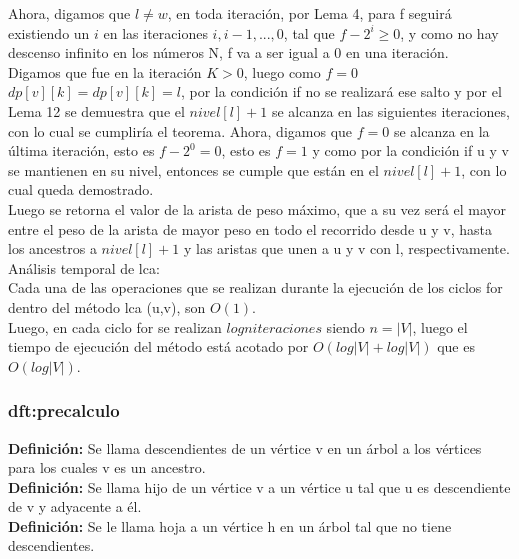 \documentclass[12pt]{article}
\begin{document}
Ahora, digamos que  $l \neq w$, en toda iteraci\'on,  por Lema 4,  para f seguir\'a existiendo un $i$ en las iteraciones 
$i,i-1,..., 0$, tal que $f - 2^i \geq 0$, y 
como no hay descenso infinito en los n\'umeros N, f va a ser igual a 0 en una iteraci\'on.\\
 Digamos que fue en la iteraci\'on $K > 0$, luego como $f = 0$
$dp[v] [k] = dp[v] [k] = l$, por la condici\'on if no se realizar\'a ese salto y por el Lema 12 se demuestra que el $nivel[l] + 1$ se alcanza en
las siguientes iteraciones, con lo cual se cumplir\'ia el teorema.  Ahora, digamos que $f = 0$ se alcanza en la \'ultima iteraci\'on, esto es $f - 2^0 = 0$,
esto es $f = 1$ y como por la condici\'on  if u y v se mantienen en su nivel, entonces se cumple que est\'an en el $nivel [l] + 1$, con lo cual
queda demostrado.\\


Luego se retorna el valor de la arista de peso m\'aximo, que a su vez ser\'a el mayor entre el peso de la arista de mayor peso en todo el recorrido desde u y v, hasta los
ancestros a $nivel [l] + 1$ y las aristas que unen a u y v con l, respectivamente.\\




An\'alisis temporal de lca:\\

Cada una de las operaciones que se realizan durante la ejecuci\'on de los ciclos for dentro del m\'etodo lca (u,v), son $O(1)$.\\

Luego, en cada ciclo for se realizan  $log n iteraciones$ siendo $n = |V|$, luego el tiempo de ejecuci\'on del m\'etodo est\'a acotado
 por $O(log |V| + log |V|)$ que es $O(log|V|)$.
\\



\subsubsection{\textbf{dft:precalculo}}

\textbf{Definición:} Se llama descendientes de un v\'ertice v en un \'arbol a los v\'ertices para los cuales v es un ancestro.\\

\textbf{Definición:} Se llama hijo de un v\'ertice v a un v\'ertice u tal que u es descendiente de v y adyacente a \'el.\\

\textbf{Definición:} Se le llama  hoja a un v\'ertice h en un \'arbol tal que no tiene descendientes.\\ 
 
\end{document}
